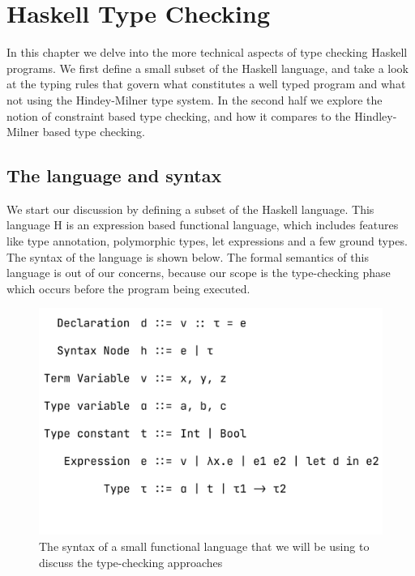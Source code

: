 
\chapter{Haskell Type Checking} %

\label{chap:haskell-type-checking}

\graphicspath{{Figures/HaskellTypeChecking}}

In this chapter we delve into the more technical aspects of type checking Haskell programs. We first define a small subset of the Haskell language, and take a look at the typing rules that govern what constitutes a well typed program and what not using the Hindey-Milner type system. In the second half we explore the notion of constraint based type checking, and how it compares to the Hindley-Milner based type checking.

\section{The language and syntax}
We start our discussion by defining a subset of the Haskell language. This language H is  an expression based functional language, which includes features like type annotation, polymorphic types, let expressions and a few ground types. The syntax of the language is shown below. The formal semantics of this language is  out of our concerns, because our scope is the type-checking phase which occurs before the program being executed.


\begin{figure}[hbt]
    \includegraphics[width=\linewidth]{LanguageSyntax}
    \caption{
      The syntax of a small functional language that we will be using to discuss the type-checking approaches
      }
  \end{figure}



